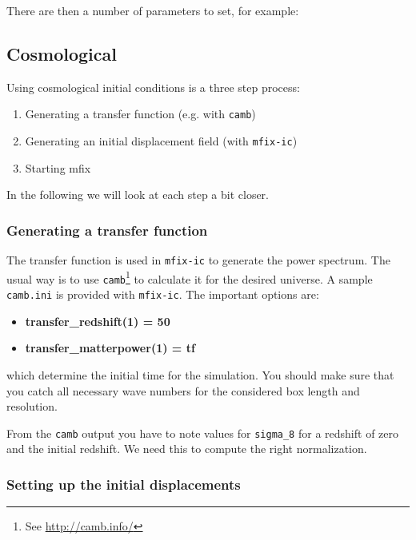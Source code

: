 \noindent There are then a number of parameters to set, for example: \\




\subsection{Cosmological}

Using cosmological initial conditions is a three step process:
\begin{enumerate}
	\item Generating a transfer function (e.g. with \texttt{camb})
	\item Generating an initial displacement field (with \texttt{mfix-ic})
	\item Starting mfix
\end{enumerate}

In the following we will look at each step a bit closer.

\subsubsection{Generating a transfer function}

	The transfer function is used in \texttt{mfix-ic} to generate the power
	spectrum. The usual way is to use \texttt{camb}\footnote{See \url{http://camb.info/}}
	to calculate it for the desired universe. A sample \texttt{camb.ini} is
	provided with \texttt{mfix-ic}. The important options are: 
	\begin{itemize}
		\item {\bf transfer\_redshift(1) = 50}
		\item {\bf transfer\_matterpower(1) = tf} 		
	\end{itemize}

	which determine the initial time for the simulation. You should make sure
	that you catch all necessary wave numbers for the considered box length and
	resolution.
	
	From the \texttt{camb} output you have to note values for \texttt{sigma\_8}
	for a redshift of zero and the initial redshift. We need this to compute
	the right normalization.
	
\subsubsection{Setting up the initial displacements}
	

